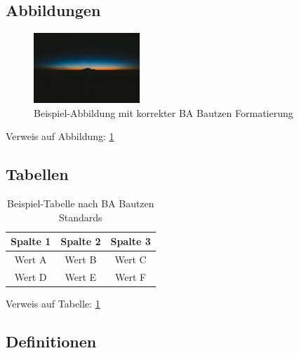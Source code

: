 \documentclass[../main.tex]{subfiles}
\begin{document}


\subsection{Abbildungen}

\begin{figure}[h]
    \centering
    \includegraphics[width=4cm]{images/picsum lorem.jpg}
    \caption{Beispiel-Abbildung mit korrekter BA Bautzen Formatierung}
    \label{fig:tutorial_image}
\end{figure}

Verweis auf Abbildung: \cref{fig:tutorial_image}

\subsection{Tabellen}

\begin{table}[h]
    \centering
    \begin{tabular}{|c|c|c|}
        \hline
        \textbf{Spalte 1} & \textbf{Spalte 2} & \textbf{Spalte 3} \\
        \hline
        Wert A & Wert B & Wert C \\
        Wert D & Wert E & Wert F \\
        \hline
    \end{tabular}
    \caption{Beispiel-Tabelle nach BA Bautzen Standards}
    \label{tab:tutorial_table}
\end{table}

Verweis auf Tabelle: \cref{tab:tutorial_table}


\subsection{Definitionen}
\end{document}
